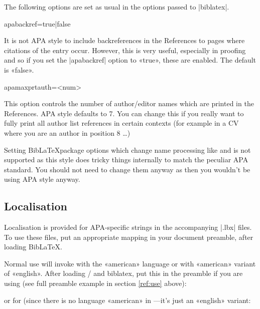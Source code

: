 \documentclass{ltxdockit}
\begin{document}
The following options are set as usual in the options passed to
|biblatex|.

\begin{ltxcode}
apabackref=true|false
\end{ltxcode}%

\noindent It is not APA style to include backreferences in the References to
pages where citations of the entry occur. However, this is very
useful, especially in proofing and so if you set the |apabackref|
option to «true», these are enabled. The default is «false».

\begin{ltxcode}
apamaxprtauth=<num>
\end{ltxcode}

\noindent This option controls the number of author/editor names which are
printed in the References. APA style defaults to 7. You can change this if
you really want to fully print all author list references in certain
contexts (for example in a CV where you are an author in position 8 \ldots)

Setting Bib\LaTeX package options which change name processing
like  and  is not supported as this style
does tricky things internally to match the peculiar APA standard. You
should not need to change them anyway as then you wouldn't be using APA
style anyway.

\subsection{Localisation}

Localisation is provided for APA-specific strings in the accompanying
|.lbx| files. To use these files, put an appropriate mapping in your
document preamble, after loading Bib\LaTeX.

Normal use will invoke  with the «american» language or
 with «american» variant of «english». After
loading / and biblatex, put this in the
preamble if you are using  (see full preamble example in section
\ref{ref:use} above):

\begin{ltxcode}
\end{ltxcode}

or for  (since there is no language «american» in
---it's just an «english» variant:
\end{document}

